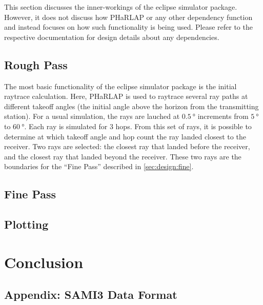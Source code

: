 \documentclass[12pt,letterpaper]{article}
\begin{document}
This section discusses the inner-workings of the eclipse simulator
package. However, it does not discuss how PHaRLAP or any other dependency
function and instead focuses on how such functionality is being used. Please
refer to the respective documentation for design details about any dependencies.

\subsection{Rough Pass}
\label{sec:design:rough}

The most basic functionality of the eclipse simulator package is the initial
raytrace calculation. Here, PHaRLAP is used to raytrace several ray paths at
different takeoff angles (the initial angle above the horizon from the
transmitting station). For a usual simulation, the rays are lauched at
$\SI{0.5}{\degree}$ increments from $\SI{5}{\degree}$ to
$\SI{60}{\degree}$. Each ray is simulated for 3 hops. From this set of rays, it
is possible to determine at which takeoff angle and hop count the ray landed
closest to the receiver. Two rays are selected: the closest ray that landed
before the receiver, and the closest ray that landed beyond the receiver. These
two rays are the boundaries for the ``Fine Pass'' described in
\autoref{sec:design:fine}.

\subsection{Fine Pass}
\label{sec:design:fine}

\subsection{Plotting}
\label{sec:design:plotting}

%
%
\section{Conclusion}
\label{sec:conclusion}

%
%
\newpage
\renewcommand{\bibname}{References}



\newpage
\begin{appendices}
  
  \section{Appendix: SAMI3 Data Format}
  \label{sec:sami3_df}

\end{appendices}
\end{document}
